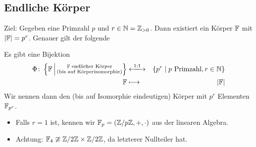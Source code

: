\documentclass[12pt,a4paper]{scrartcl}
\begin{document}
\subsection{Endliche Körper}
Ziel: Gegeben eine Primzahl $p$ und $r\in\mathbb N= \mathbb Z_{>0}$. Dann existiert ein Körper $\mathbb F$ mit $|\mathbb F| = p^r$. Genauer gilt der folgende
\begin{satz}[Klassifikationssatz]\label{thm:17.1}
	Es gibt eine Bijektion
	\begin{eqnarray*}
		\Phi\colon\left\{\IF\,\middle|\,\substack{\text{$\IF$ endlicher Körper}\\\text{(bis auf Körperisomorphie)}}\right\}& \xlongleftrightarrow{1:1}& \{p^r\mid \text{$p$ Primzahl}, r\in\IN\}\\
		\IF & \longmapsto & |\IF|
	\end{eqnarray*}
	Wir nennen dann den (bis auf Isomorphie eindeutigen) Körper mit $p^r$ Elementen $\mathbb F_{p^r}$.
\end{satz}
\begin{bem}
	\leavevmode
	\begin{itemize}
		\item Falls $r = 1$ ist, kennen wir $\mathbb F_p = (\mathbb Z/p\mathbb Z, +, \cdot)$ aus der linearen Algebra.
		\item Achtung: $\mathbb F_4 \ncong \mathbb Z/2\mathbb Z\times \mathbb Z/2\mathbb Z$, da letzterer Nullteiler hat.
	\end{itemize}
\end{bem}
\end{document}
